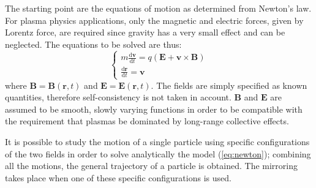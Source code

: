 The starting point are the equations of motion as determined from Newton’s law. For plasma physics applications, only the magnetic and electric forces, given by Lorentz force, are required since gravity has a very small effect and can be neglected. The equations to be solved are thus:
\begin{equation}\label{eq:newton}
  \begin{cases}
    m\frac{\mathrm{d}\mathbf{v}}{\mathrm{d}t}=q(\mathbf{E}+\textbf{v}\times{\mathbf{B}})\\
    \frac{\mathrm{d}\mathbf{r}}{\mathrm{d}t}=\mathbf{v}
  \end{cases}
\end{equation}
where $\mathbf{B}=\mathbf{B}(\mathbf{r},t)$ and $\mathbf{E}=\mathbf{E}(\mathbf{r},t)$. The fields are simply specified as known quantities, therefore self-consistency is not taken in account. $\textbf{B}$ and $\textbf{E}$ are assumed to be smooth, slowly varying functions in order to be compatible with the requirement that plasmas be dominated by long-range collective effects.

It is possible to study the motion of a single particle using specific configurations of the two fields in order to solve analytically the model (\ref{eq:newton}); combining all the motions, the general trajectory of a particle is obtained. The mirroring takes place when one of these specific configurations is used.
\medskip

